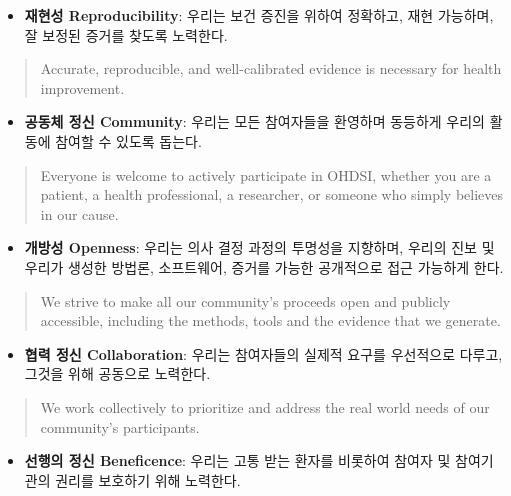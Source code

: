\documentclass[]{book}
\providecommand{\tightlist}{%
  \setlength{\itemsep}{0pt}\setlength{\parskip}{0pt}}
\begin{document}
\begin{itemize}
\tightlist
\item
  \textbf{재현성 Reproducibility}: 우리는 보건 증진을 위하여 정확하고,
  재현 가능하며, 잘 보정된 증거를 찾도록 노력한다.
\end{itemize}

\begin{quote}
Accurate, reproducible, and well-calibrated evidence is necessary for
health improvement.
\end{quote}

\begin{itemize}
\tightlist
\item
  \textbf{공동체 정신 Community}: 우리는 모든 참여자들을 환영하며
  동등하게 우리의 활동에 참여할 수 있도록 돕는다.
\end{itemize}

\begin{quote}
Everyone is welcome to actively participate in OHDSI, whether you are a
patient, a health professional, a researcher, or someone who simply
believes in our cause.
\end{quote}

\begin{itemize}
\tightlist
\item
  \textbf{개방성 Openness}: 우리는 의사 결정 과정의 투명성을 지향하며,
  우리의 진보 및 우리가 생성한 방법론, 소프트웨어, 증거를 가능한
  공개적으로 접근 가능하게 한다.
\end{itemize}

\begin{quote}
We strive to make all our community's proceeds open and publicly
accessible, including the methods, tools and the evidence that we
generate.
\end{quote}

\begin{itemize}
\tightlist
\item
  \textbf{협력 정신 Collaboration}: 우리는 참여자들의 실제적 요구를
  우선적으로 다루고, 그것을 위해 공동으로 노력한다.
\end{itemize}

\begin{quote}
We work collectively to prioritize and address the real world needs of
our community's participants.
\end{quote}

\begin{itemize}
\tightlist
\item
  \textbf{선행의 정신 Beneficence}: 우리는 고통 받는 환자를 비롯하여
  참여자 및 참여기관의 권리를 보호하기 위해 노력한다.
\end{itemize}
\end{document}
